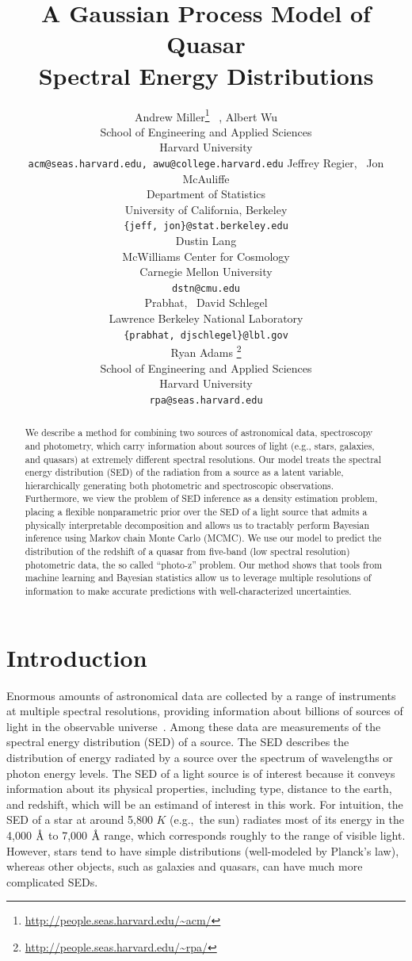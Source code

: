 \documentclass{article} %
\title{A Gaussian Process Model of Quasar \\ Spectral Energy Distributions}
\author{
Andrew Miller\thanks{\url{http://people.seas.harvard.edu/\~acm/}} \, ,  Albert Wu \\
School of Engineering and Applied Sciences\\
Harvard University\\
\texttt{acm@seas.harvard.edu, awu@college.harvard.edu}
\And
Jeffrey Regier, \, Jon McAuliffe \\
Department of Statistics \\
University of California, Berkeley \\
\texttt{\{jeff, jon\}@stat.berkeley.edu} \\
\And
Dustin Lang \\
McWilliams Center for Cosmology \\
Carnegie Mellon University \\
\texttt{dstn@cmu.edu} \\
\And
Prabhat, \, David Schlegel \\
Lawrence Berkeley National Laboratory \\
\texttt{\{prabhat, djschlegel\}@lbl.gov} \\
\And
Ryan Adams \thanks{\url{http://people.seas.harvard.edu/\~rpa/}}\\
School of Engineering and Applied Sciences\\
Harvard University\\
\texttt{rpa@seas.harvard.edu} \\
}
\begin{document}
\maketitle

\begin{abstract} 
We describe a method for combining two sources of astronomical data, spectroscopy and photometry, which carry information about sources of light (e.g., stars, galaxies, and quasars) at extremely different spectral resolutions. 
Our model treats the spectral energy distribution (SED) of the radiation from a source as a latent variable, hierarchically generating both photometric and spectroscopic observations.  
Furthermore, we view the problem of SED inference as a density estimation problem, placing a flexible nonparametric prior over the SED of a light source that admits a physically interpretable decomposition and allows us to tractably perform Bayesian inference using Markov chain Monte Carlo (MCMC).  
We use our model to predict the distribution of the redshift of a quasar from five-band (low spectral resolution) photometric data, the so called ``photo-z'' problem. 
Our method shows that tools from machine learning and Bayesian statistics allow us to leverage multiple resolutions of information to make accurate predictions with well-characterized uncertainties. 
\end{abstract} 

\section{Introduction}
Enormous amounts of astronomical data are collected by a range of instruments at multiple spectral resolutions, providing information about billions of sources of light in the observable universe~\cite{alam2015eleventh, martin2005galex}.  
Among these data are measurements of the spectral energy distribution (SED) of a source.  
The SED describes the distribution of energy radiated by a source over the spectrum of wavelengths or photon energy levels.
The SED of a light source is of interest because it conveys information about its physical properties, including type, distance to the earth, and redshift, which will be an estimand of interest in this work. 
For intuition, the SED of a star at around 5,800 $K$ (e.g.,~the sun) radiates most of its energy in the 4,000 $\textup{\AA}$ to 7,000 $\textup{\AA}$ range, which corresponds roughly to the range of visible light.  
However, stars tend to have simple distributions (well-modeled by Planck's law), whereas other objects, such as galaxies and quasars, can have much more complicated SEDs.  
\end{document}
